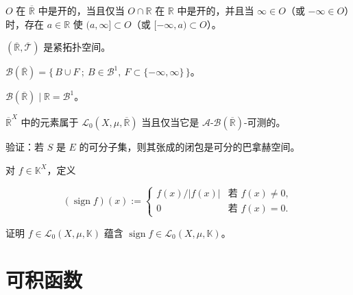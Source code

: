 \begin{exercises}
\begin{items}
\item

$ O $ 在 $ \overline{\mathbb{R}} $ 中是开的，当且仅当 $ O \cap \mathbb{R} $ 在 $ \mathbb{R} $ 中是开的，并且当 $ \infty \in O $（或 $ -\infty \in O $）时，存在 $ a \in \mathbb{R} $ 使 $ (a,\infty] \subset O $（或 $ [-\infty,a) \subset O $）。

\item

$ (\overline{\mathbb{R}},\overline{\mathcal{T}}) $ 是紧拓扑空间。

\item

$ \mathcal{B}(\overline{\mathbb{R}}) = \{\, B \cup F \ ;\ B \in \mathcal{B}^{1},\ F \subset \{-\infty,\infty\} \,\} $。

\item

$ \mathcal{B}(\overline{\mathbb{R}}) \mid \mathbb{R} = \mathcal{B}^{1} $。

\item

$ \overline{\mathbb{R}}^{X} $ 中的元素属于 $ \mathcal{L}_0(X,\mu,\overline{\mathbb{R}}) $ 当且仅当它是 $ \mathcal{A} \text{-} \mathcal{B}(\overline{\mathbb{R}}) $-可测的。

\end{items}

\item

验证：若 $ S $ 是 $ E $ 的可分子集，则其张成的闭包是可分的巴拿赫空间。

\item

对 $ f \in \mathbb{K}^{X} $，定义

\begin{equation*}
(\operatorname{sign} f)(x) := \begin{cases} f(x)/|f(x)| & \text{若 } f(x) \ne 0, \\ 0 & \text{若 } f(x) = 0. \end{cases}
\end{equation*}

证明 $ f \in \mathcal{L}_0(X,\mu,\mathbb{K}) $ 蕴含 $ \operatorname{sign} f \in \mathcal{L}_0(X,\mu,\mathbb{K}) $。

\end{exercises}

\section{可积函数}

